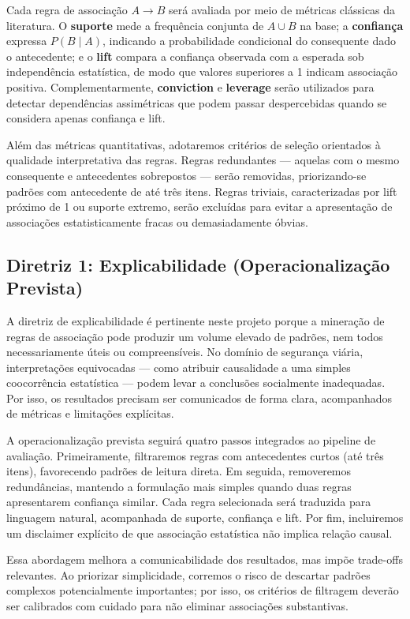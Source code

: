 \documentclass[12pt]{article}
\begin{document}
Cada regra de associação $A \rightarrow B$ será avaliada por meio de métricas clássicas da literatura. O \textbf{suporte} mede a frequência conjunta de $A \cup B$ na base; a \textbf{confiança} expressa $P(B \mid A)$, indicando a probabilidade condicional do consequente dado o antecedente; e o \textbf{lift} compara a confiança observada com a esperada sob independência estatística, de modo que valores superiores a 1 indicam associação positiva. Complementarmente, \textbf{conviction} e \textbf{leverage} serão utilizados para detectar dependências assimétricas que podem passar despercebidas quando se considera apenas confiança e lift.

Além das métricas quantitativas, adotaremos critérios de seleção orientados à qualidade interpretativa das regras. Regras redundantes --- aquelas com o mesmo consequente e antecedentes sobrepostos --- serão removidas, priorizando-se padrões com antecedente de até três itens. Regras triviais, caracterizadas por lift próximo de 1 ou suporte extremo, serão excluídas para evitar a apresentação de associações estatisticamente fracas ou demasiadamente óbvias.

\subsection{Diretriz 1: Explicabilidade (Operacionalização Prevista)}

A diretriz de explicabilidade é pertinente neste projeto porque a mineração de regras de associação pode produzir um volume elevado de padrões, nem todos necessariamente úteis ou compreensíveis. No domínio de segurança viária, interpretações equivocadas --- como atribuir causalidade a uma simples coocorrência estatística --- podem levar a conclusões socialmente inadequadas. Por isso, os resultados precisam ser comunicados de forma clara, acompanhados de métricas e limitações explícitas.

A operacionalização prevista seguirá quatro passos integrados ao pipeline de avaliação. Primeiramente, filtraremos regras com antecedentes curtos (até três itens), favorecendo padrões de leitura direta. Em seguida, removeremos redundâncias, mantendo a formulação mais simples quando duas regras apresentarem confiança similar. Cada regra selecionada será traduzida para linguagem natural, acompanhada de suporte, confiança e lift. Por fim, incluiremos um disclaimer explícito de que associação estatística não implica relação causal.

Essa abordagem melhora a comunicabilidade dos resultados, mas impõe trade-offs relevantes. Ao priorizar simplicidade, corremos o risco de descartar padrões complexos potencialmente importantes; por isso, os critérios de filtragem deverão ser calibrados com cuidado para não eliminar associações substantivas.
\end{document}
